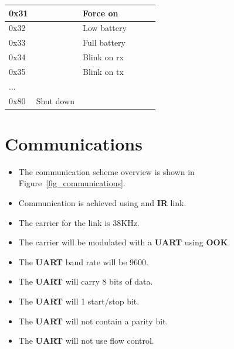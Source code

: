\documentclass[a4paper]{article}
\begin{document}
\begin{table}[h]
\begin{tabular}{|l|l|l|l|l|l|}
               0x31           &                       &  Force on             &                    &                       &                       \\ \hline   
               0x32           &                       &  Low battery          &                    &                       &                       \\ \hline   
               0x33           &                       &  Full battery         &                    &                       &                       \\ \hline   
               0x34           &                       &  Blink on rx          &                    &                       &                       \\ \hline   
               0x35           &                       &  Blink on tx          &                    &                       &                       \\ \hline   
               ...            &                       &                       &                    &                       &                       \\ \hline   
               0x80           &  Shut down            &                       &                    &                       &                       \\ \hline   

         
         \end{tabular}
      \end{table}


\section{Communications}
 
\begin{itemize}
   \item The communication scheme overview is shown in Figure~\ref{fig_communications}. 
   \item Communication is achieved using and \textbf{IR} link.
   \item The carrier for the link is 38KHz.
   \item The carrier will be modulated with a \textbf{UART} using \textbf{OOK}.
   \item The \textbf{UART} baud rate will be 9600.
   \item The \textbf{UART} will carry 8 bits of data.
   \item The \textbf{UART} will 1 start/stop bit.
   \item The \textbf{UART} will not contain a parity bit.
   \item The \textbf{UART} will not use flow control.
\end{itemize}
\end{document}
